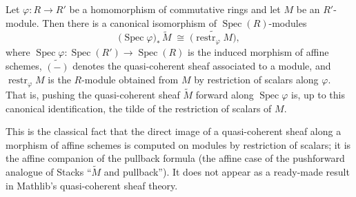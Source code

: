\begin{lemma}
  \label{lem:pushforward_spec_tilde_iso}
  Let \(\varphi : R \to R'\) be a homomorphism of commutative rings and let \(M\)
  be an \(R'\)-module. Then there is a canonical isomorphism of
  \(\operatorname{Spec}(R)\)-modules
  \[
    \bigl(\operatorname{Spec}\varphi\bigr)_*\,\widetilde{M}
    \;\cong\;
    \widetilde{\bigl(\operatorname{restr}_\varphi M\bigr)},
  \]
  where \(\operatorname{Spec}\varphi : \operatorname{Spec}(R') \to
  \operatorname{Spec}(R)\) is the induced morphism of affine schemes,
  \(\widetilde{(-)}\) denotes the quasi-coherent sheaf associated to a module, and
  \(\operatorname{restr}_\varphi M\) is the \(R\)-module obtained from \(M\) by
  restriction of scalars along \(\varphi\). That is, pushing the quasi-coherent
  sheaf \(\widetilde{M}\) forward along \(\operatorname{Spec}\varphi\) is, up to
  this canonical identification, the tilde of the restriction of scalars of \(M\).

  This is the classical fact that the direct image of a quasi-coherent sheaf along
  a morphism of affine schemes is computed on modules by restriction of scalars; it
  is the affine companion of the pullback formula (the affine case of the
  pushforward analogue of Stacks ``$\widetilde{M}$ and pullback''). It does not
  appear as a ready-made result in Mathlib's quasi-coherent sheaf theory.
\end{lemma}

